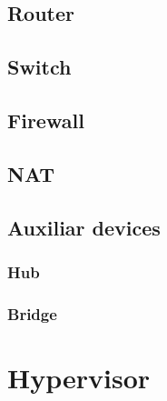 \subsection{Router}
\label{sub-sec:router}
\cite{linnetarch}
\subsection{Switch}
\label{sub-sec:switch}

\subsection{Firewall}
\label{sub-sec:firewall}

\subsection{NAT}
\label{sub-sec:nat}

\subsection{Auxiliar devices}
\label{sub-sec:auxdev}

\subsubsection{Hub}

\subsubsection{Bridge}

\section{Hypervisor}
\label{sub-sec:hypervisor}
